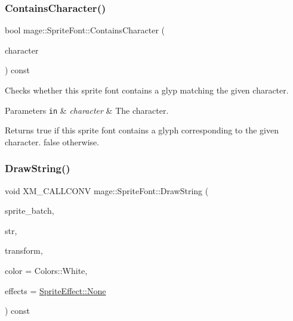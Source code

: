 \subsubsection{\texorpdfstring{Contains\+Character()}{ContainsCharacter()}}
{\footnotesize\ttfamily bool mage\+::\+Sprite\+Font\+::\+Contains\+Character (\begin{DoxyParamCaption}\item[{wchar\+\_\+t}]{character }\end{DoxyParamCaption}) const}

Checks whether this sprite font contains a glyp matching the given character.


\begin{DoxyParams}[1]{Parameters}
\mbox{\tt in}  & {\em character} & The character. \\
\hline
\end{DoxyParams}
\begin{DoxyReturn}{Returns}
{\ttfamily true} if this sprite font contains a glyph corresponding to the given character. {\ttfamily false} otherwise. 
\end{DoxyReturn}
\hypertarget{classmage_1_1_sprite_font_a02498ef183874ed31c408fc142a8231e}{}\label{classmage_1_1_sprite_font_a02498ef183874ed31c408fc142a8231e} 
\subsubsection{\texorpdfstring{Draw\+String()}{DrawString()}\hspace{0.1cm}{\footnotesize\ttfamily [1/2]}}
{\footnotesize\ttfamily void X\+M\+\_\+\+C\+A\+L\+L\+C\+O\+NV mage\+::\+Sprite\+Font\+::\+Draw\+String (\begin{DoxyParamCaption}\item[{\hyperlink{classmage_1_1_sprite_batch}{Sprite\+Batch} \&}]{sprite\+\_\+batch,  }\item[{const wchar\+\_\+t $\ast$}]{str,  }\item[{const \hyperlink{structmage_1_1_sprite_transform}{Sprite\+Transform} \&}]{transform,  }\item[{F\+X\+M\+V\+E\+C\+T\+OR}]{color = {\ttfamily Colors\+:\+:White},  }\item[{\hyperlink{namespacemage_a9cfe18123066ba4236f548f9de75d881}{Sprite\+Effect}}]{effects = {\ttfamily \hyperlink{namespacemage_a5e7e18b0154373ce8fc942fe3f6b27fda6adf97f83acf6453d4a6a4b1070f3754}{Sprite\+Effect\+::\+None}} }\end{DoxyParamCaption}) const}

